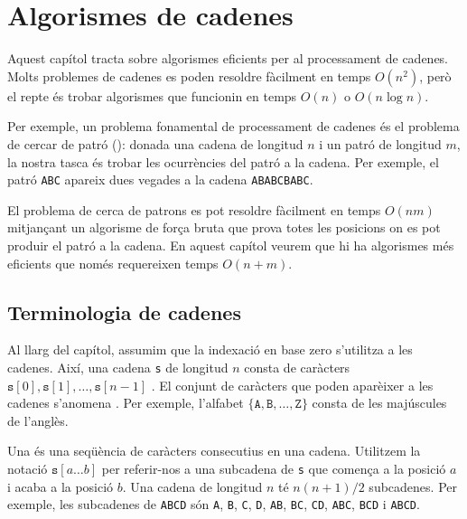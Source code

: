\chapter{Algorismes de cadenes}

Aquest capítol tracta sobre algorismes eficients per al processament
de cadenes. Molts problemes de cadenes es poden resoldre fàcilment en
temps $O(n^2)$, però el repte és trobar algorismes que funcionin en
temps $O(n)$ o $O(n \log n)$.


Per exemple, un problema fonamental de processament de cadenes és el
problema de cercar de patró (): donada una
cadena de longitud $n$ i un patró de longitud $m$, la nostra tasca és
trobar les ocurrències del patró a la cadena. Per exemple, el patró
\texttt{ABC} apareix dues vegades a la cadena \texttt{ABABCBABC}.

El problema de cerca de patrons es pot resoldre fàcilment en temps
$O(nm)$ mitjançant un algorisme de força bruta que prova totes les
posicions on es pot produir el patró a la cadena. En aquest capítol
veurem que hi ha algorismes més eficients que només requereixen temps
$O(n+m)$.


\section{Terminologia de cadenes}


Al llarg del capítol, assumim que la indexació en base zero s'utilitza
a les cadenes. Així, una cadena \texttt{s} de longitud $n$ consta de
caràcters $\texttt{s}[0],\texttt{s}[1],\ldots,\texttt{s}[n-1]$ . El
conjunt de caràcters que poden aparèixer a les cadenes s'anomena
. Per exemple, l'alfabet
$\{\texttt{A},\texttt{B},\ldots,\texttt{Z}\}$ consta de les majúscules
de l'anglès.


Una  és una seqüència de caràcters consecutius en una
cadena. Utilitzem la notació $\texttt{s}[a \ldots b]$ per referir-nos
a una subcadena de \texttt{s} que comença a la posició $a$ i acaba a
la posició $b$. Una cadena de longitud $n$ té $n(n+1)/2$
subcadenes. Per exemple, les subcadenes de \texttt{ABCD} són
\texttt{A}, \texttt{B}, \texttt{C}, \texttt{D}, \texttt{AB},
\texttt{BC}, \texttt {CD}, \texttt{ABC}, \texttt{BCD} i \texttt{ABCD}.

